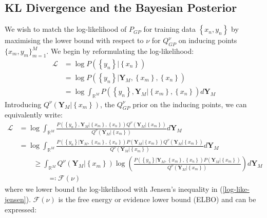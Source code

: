 \documentclass{article}
\numberwithin{equation}{section}
\begin{document}
\subsection{KL Divergence and the Bayesian Posterior}\label{svgp-kld-bayesian}
We wish to match the log-likelihood of $P_{GP}$ for training data $\left\{ x_n, y_n\right\}$ by maximising the lower bound with respect to $\nu$ for $Q_{GP}^{\nu}$ on inducing points $\{x_m, y_m\}_{m=1}^{M}$. We begin by reformulating the log-likelihood:
\begin{align}
    \mathcal{L} &= \log P\left(\left\{ y_n\right\} \big\vert\left\{ x_n\right\}\right)
    \\&= \log P\left(\left\{ y_n\right\} \big\vert \mathbf{Y}_M, \left\{ x_m\right\}, \left\{ x_n\right\}\right)
    \\&= \log \int_{\mathbb{R}^M} P\left(\left\{ y_n\right\}, \mathbf{Y}_M \big\vert \left\{ x_m\right\}, \left\{ x_n\right\}\right) d\mathbf{Y}_M
\end{align}
Introducing $Q^{\nu}\left(\mathbf{Y}_M \big\vert \left\{ x_m\right\} \right)$, the $Q_{GP}^{\nu}$ prior on the inducing points, we can equivalently write:
\begin{align}
            \mathcal{L} &= \log \int_{\mathbb{R}^M} \frac{P\left(\left\{ y_n\right\}, \mathbf{Y}_M \big\vert \left\{ x_m\right\}, \left\{ x_n\right\}\right)Q^{\nu}\left(\mathbf{Y}_M \big\vert \left\{ x_m\right\} \right)}{Q^{\nu}\left(\mathbf{Y}_M \big\vert \left\{ x_m\right\} \right)} d\mathbf{Y}_M
    \\&= \log \int_{\mathbb{R}^M} \frac{P\left(\left\{ y_n\right\} \big\vert \mathbf{Y}_M , \left\{ x_m\right\}, \left\{ x_n\right\}\right)P\left(\mathbf{Y}_M \big\vert \left\{ x_m\right\}\right)Q^{\nu}\left(\mathbf{Y}_M \big\vert \left\{ x_m\right\} \right)}{Q^{\nu}\left(\mathbf{Y}_M \big\vert \left\{ x_m\right\} \right)} d\mathbf{Y}_M
    \\&\qquad\geq  \int_{\mathbb{R}^M} Q^{\nu}\left(\mathbf{Y}_M \big\vert \left\{ x_m\right\} \right) \log \left(\frac{P\left(\left\{ y_n\right\} \big\vert \mathbf{Y}_M , \left\{ x_m\right\}, \left\{ x_n\right\}\right)P\left(\mathbf{Y}_M \big\vert \left\{ x_m\right\}\right)}{Q^{\nu}\left(\mathbf{Y}_M \big\vert \left\{ x_m\right\} \right)} \right)d\mathbf{Y}_M
    \label{log-like-jensen}
    \\ & \qquad\qquad \eqqcolon \mathcal{F(\nu)}
\end{align}
where we lower bound the log-likelihood with Jensen's inequality in (\ref{log-like-jensen}). $\mathcal{F(\nu)}$ is the free energy or evidence lower bound (ELBO) and can be expressed:
\end{document}
